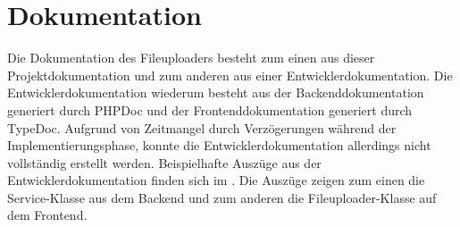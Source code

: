 \section{Dokumentation}
\label{sec:Dokumentation}
Die Dokumentation des Fileuploaders besteht zum einen aus dieser Projektdokumentation und zum anderen aus einer Entwicklerdokumentation. Die Entwicklerdokumentation wiederum besteht aus der Backenddokumentation generiert durch PHPDoc und der Frontenddokumentation generiert durch TypeDoc. Aufgrund von Zeitmangel durch Verzögerungen während der Implementierungsphase, konnte die Entwicklerdokumentation allerdings nicht vollständig erstellt werden. Beispielhafte Auszüge aus der Entwicklerdokumentation finden sich im . Die Auszüge zeigen zum einen die Service-Klasse aus dem Backend und zum anderen die Fileuploader-Klasse auf dem Frontend.